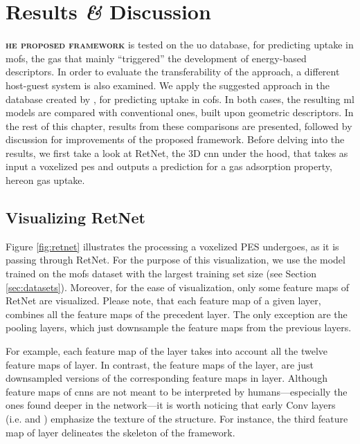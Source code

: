 \chapter{Results \textit{\&} Discussion}

\lettrine[
	nindent=0em, findent=0.5em, loversize=-0.12, lines=5
]{}{\bfseries\color{Blue}he proposed framework} is tested on the
\gls{uo} database, for predicting  uptake in \glspl{mof}, the
gas that mainly ``triggered'' the development of energy-based
descriptors. In order to evaluate the
transferability of the approach, a different host-guest system is also examined.
We apply the suggested approach in the database created by
\textcite{Mercado_2018}, for predicting  uptake in \glspl{cof}. In both
cases, the resulting \gls{ml} models are compared with conventional ones, built
upon geometric descriptors. In the rest of this
chapter, results from these comparisons are presented, followed by discussion
for improvements of the proposed framework. Before delving into the results, we
first take a look at RetNet, the 3D \gls{cnn} under the hood, that
takes as input a voxelized \gls{pes} and outputs a
prediction for a gas adsorption property, hereon gas
uptake.

\section{Visualizing RetNet}

Figure \ref{fig:retnet} illustrates the processing a voxelized PES undergoes, as
it is passing through RetNet. For the purpose of this visualization, we use the
model trained on the \glspl{mof} dataset with the largest training set size (see
Section \ref{sec:datasets}). Moreover, for the ease of visualization, only some
feature maps of RetNet are visualized. Please note, that each feature
map of a given layer, combines all the feature maps of the
precedent layer. The only exception are the pooling layers,
which just downsample the feature maps from the previous
layers.

For example, each feature map of the  layer takes into account all
the twelve feature maps of  layer. In contrast, the feature maps of the
 layer, are just downsampled versions of the corresponding feature maps
in  layer. Although feature maps of \glspl{cnn} are not meant to be
interpreted by humans---especially the ones found deeper in the network---it is
worth noticing that early Conv layers (i.e.  and
) emphasize the texture of the structure. For instance, the third
feature map of  layer delineates the skeleton of the framework.


